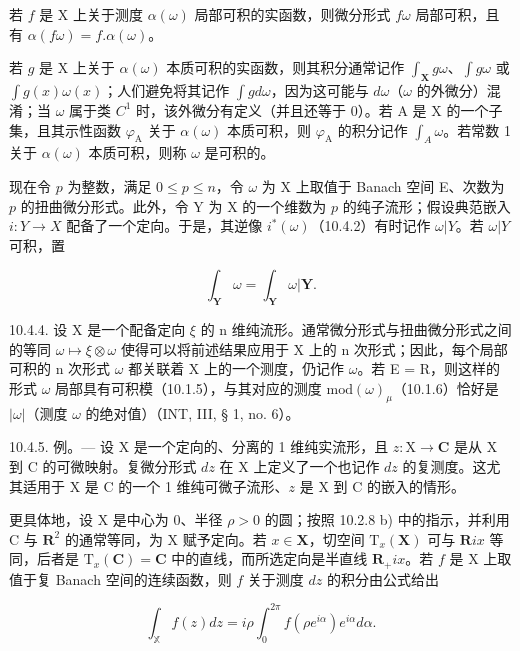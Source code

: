 若 \(f\) 是 X 上关于测度 \(\alpha(\omega)\) 局部可积的实函数，则微分形式 \(f\omega\) 局部可积，且有 \(\alpha(f\omega) = f.\alpha(\omega)\)。

若 \(g\) 是 X 上关于 \(\alpha(\omega)\) 本质可积的实函数，则其积分通常记作 \(\int_{\mathbf{X}} g\omega\)、\(\int g\omega\) 或 \(\int g(x)\omega(x)\)；人们避免将其记作 \(\int g d\omega\)，因为这可能与 \(d\omega\)（\(\omega\) 的外微分）混淆；当 \(\omega\) 属于类 \(C^{1}\) 时，该外微分有定义（并且还等于 0）。若 A 是 X 的一个子集，且其示性函数 \(\varphi_{\mathrm{A}}\) 关于 \(\alpha(\omega)\) 本质可积，则 \(\varphi_{\mathrm{A}}\) 的积分记作 \(\int_{A} \omega\)。若常数 1 关于 \(\alpha(\omega)\) 本质可积，则称 \(\omega\) 是可积的。

现在令 \(p\) 为整数，满足 \(0 \leqslant p \leqslant n\)，令 \(\omega\) 为 X 上取值于 Banach 空间 E、次数为 \(p\) 的扭曲微分形式。此外，令 Y 为 X 的一个维数为 \(p\) 的纯子流形；假设典范嵌入 \(i: Y \to X\) 配备了一个定向。于是，其逆像 \(i^{*}(\omega)\)（10.4.2）有时记作 \(\omega|Y\)。若 \(\omega|Y\) 可积，置

\[
\int_ {\mathbf {Y}} \omega = \int_ {\mathbf {Y}} \omega | \mathbf {Y}.
\]

10.4.4. 设 X 是一个配备定向 \(\xi\) 的 n 维纯流形。通常微分形式与扭曲微分形式之间的等同 \(\omega \mapsto \xi \otimes \omega\) 使得可以将前述结果应用于 X 上的 n 次形式；因此，每个局部可积的 n 次形式 \(\omega\) 都关联着 X 上的一个测度，仍记作 \(\omega\)。若 E = R，则这样的形式 \(\omega\) 局部具有可积模（10.1.5），与其对应的测度 \(\text{mod}(\omega)_{\mu}\)（10.1.6）恰好是 \(|\omega|\)（测度 \(\omega\) 的绝对值）（INT, III, § 1, no. 6）。

10.4.5. 例。--- 设 X 是一个定向的、分离的 1 维纯实流形，且 \(z: \mathrm{X} \to \mathbf{C}\) 是从 X 到 C 的可微映射。复微分形式 \(dz\) 在 X 上定义了一个也记作 \(dz\) 的复测度。这尤其适用于 X 是 C 的一个 1 维纯可微子流形、\(z\) 是 X 到 C 的嵌入的情形。

更具体地，设 X 是中心为 0、半径 \(\rho > 0\) 的圆；按照 10.2.8 b) 中的指示，并利用 C 与 \(\mathbf{R}^2\) 的通常等同，为 X 赋予定向。若 \(x \in \mathbf{X}\)，切空间 \(\mathrm{T}_x(\mathbf{X})\) 可与 \(\mathbf{R}ix\) 等同，后者是 \(\mathrm{T}_x(\mathbf{C}) = \mathbf{C}\) 中的直线，而所选定向是半直线 \(\mathbf{R}_+ix\)。若 \(f\) 是 X 上取值于复 Banach 空间的连续函数，则 \(f\) 关于测度 \(dz\) 的积分由公式给出

\[
\int_ {\mathbb {X}} f (z) d z = i \rho \int_ {0} ^ {2 \pi} f (\rho e ^ {i \alpha}) e ^ {i \alpha} d \alpha .
\]

